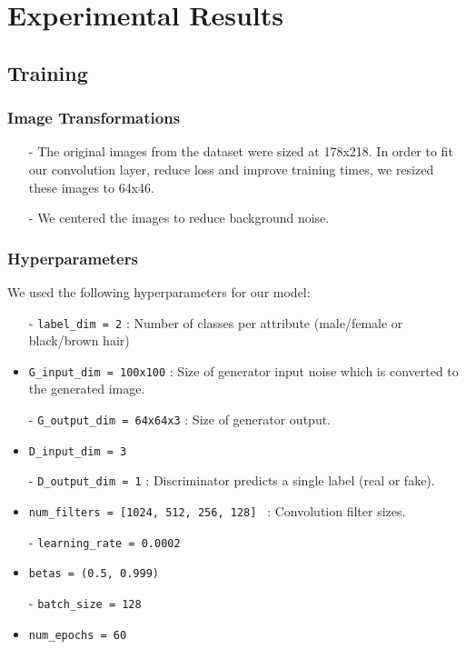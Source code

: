 \documentclass[twocolumn,10pt,cleanfoot]{asme2ej}
\begin{document}
\section{Experimental Results \\}
\subsection{Training}
\subsubsection{Image Transformations}
\begin{itemize}
    \item[-] The original images from the dataset were sized at 178x218. In order to fit our convolution layer, reduce loss and improve training times, we resized these images to 64x46.
    \item[-] We centered the images to reduce background noise.
\end{itemize}
\subsubsection{Hyperparameters}
We used the following hyperparameters for our model:
\begin{itemize}
    \item[-] \lstinline{label_dim = 2} : Number of classes per attribute (male/female or black/brown hair)
    \item[-] \lstinline{G_input_dim = 100x100} : Size of generator input noise which is converted to the generated image.
    \item[-] \lstinline{G_output_dim = 64x64x3} : Size of generator output.
    \item[-] \lstinline{D_input_dim = 3}
    \item[-] \lstinline{D_output_dim = 1} : Discriminator predicts a single label (real or fake).
    \item[-] \lstinline{num_filters = [1024, 512, 256, 128] } : Convolution filter sizes.
    \item[-] \lstinline{learning_rate = 0.0002}
    \item[-] \lstinline{betas = (0.5, 0.999)}
    \item[-] \lstinline{batch_size = 128}
    \item[-] \lstinline{num_epochs = 60}
\end{itemize}
\end{document}
